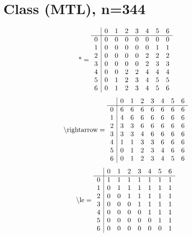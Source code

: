\documentclass[11pt]{article}
\begin{document}
\section{Class (MTL), n=344}
\[\text{*} = 
\begin{array}{r | r r r r r r r}
 & 0 & 1 & 2 & 3 & 4 & 5 & 6 \\ \hline
0 & 0 & 0 & 0 & 0 & 0 & 0 & 0 \\
1 & 0 & 0 & 0 & 0 & 0 & 1 & 1 \\
2 & 0 & 0 & 0 & 0 & 2 & 2 & 2 \\
3 & 0 & 0 & 0 & 0 & 2 & 3 & 3 \\
4 & 0 & 0 & 2 & 2 & 4 & 4 & 4 \\
5 & 0 & 1 & 2 & 3 & 4 & 5 & 5 \\
6 & 0 & 1 & 2 & 3 & 4 & 5 & 6 \\
\end{array}
\]
\[\text{\textbackslash rightarrow} = 
\begin{array}{r | r r r r r r r}
 & 0 & 1 & 2 & 3 & 4 & 5 & 6 \\ \hline
0 & 6 & 6 & 6 & 6 & 6 & 6 & 6 \\
1 & 4 & 6 & 6 & 6 & 6 & 6 & 6 \\
2 & 3 & 3 & 6 & 6 & 6 & 6 & 6 \\
3 & 3 & 3 & 4 & 6 & 6 & 6 & 6 \\
4 & 1 & 1 & 3 & 3 & 6 & 6 & 6 \\
5 & 0 & 1 & 2 & 3 & 4 & 6 & 6 \\
6 & 0 & 1 & 2 & 3 & 4 & 5 & 6 \\
\end{array}
\]
\[\text{\textbackslash le} = 
\begin{array}{r | r r r r r r r}
 & 0 & 1 & 2 & 3 & 4 & 5 & 6 \\ \hline
0 & 1 & 1 & 1 & 1 & 1 & 1 & 1 \\
1 & 0 & 1 & 1 & 1 & 1 & 1 & 1 \\
2 & 0 & 0 & 1 & 1 & 1 & 1 & 1 \\
3 & 0 & 0 & 0 & 1 & 1 & 1 & 1 \\
4 & 0 & 0 & 0 & 0 & 1 & 1 & 1 \\
5 & 0 & 0 & 0 & 0 & 0 & 1 & 1 \\
6 & 0 & 0 & 0 & 0 & 0 & 0 & 1 \\
\end{array}
\]
\end{document}
